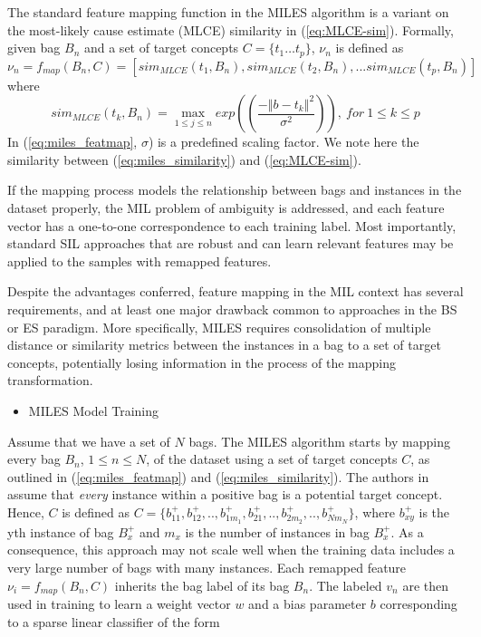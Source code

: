 \documentclass[12pt,dvips]{report}
\numberwithin{equation}{section}
\begin{document}
The standard feature mapping function in the MILES algorithm is a variant on the most-likely cause estimate (MLCE) similarity in (\ref{eq:MLCE-sim}). Formally, given bag $B_{n}$ and a set of target concepts $C=\{t_{1}\ldots t_{p}\}$, $\nu_{n}$ is defined as 
\begin{equation}
\nu_{n}=f_{map}(B_{n},C)=[sim_{MLCE}(t_{1},B_{n}),sim_{MLCE}(t_{2},B_{n}),...sim_{MLCE}(t_{p},B_{n})]\label{eq:miles_featmap}
\end{equation} where 
\begin{equation}
sim_{MLCE}(t_{k},B_{n})=\max\limits_{1 \leq j \leq n}exp({\left(\frac{-\left\Vert b-t_{k}\right\Vert ^{2}}{\sigma^{2}}\right)}),\: for\:1\leq k\leq p\label{eq:miles_similarity}
\end{equation}  In (\ref{eq:miles_featmap}, $\sigma$) is a predefined scaling factor. We note here the similarity between (\ref{eq:miles_similarity}) and (\ref{eq:MLCE-sim}).

If the mapping process models the relationship between bags and instances in the dataset properly, the MIL problem of ambiguity is addressed, and each feature vector has a one-to-one correspondence to each training label. Most importantly, standard SIL approaches that are robust and can learn relevant features may be applied to the samples with remapped features. 

Despite the advantages conferred, feature mapping in the MIL context has several requirements, and at least one major drawback common to approaches in the BS or ES paradigm.  More specifically, MILES requires consolidation of multiple distance or similarity metrics between the instances in a bag to a set of target concepts, potentially losing information in the process of the mapping transformation.

\begin{itemize}[leftmargin=12 pt]
\item MILES Model Training
\end{itemize}

Assume that we have a set of $N$ bags. The MILES algorithm starts by mapping every bag $B_{n}$, $1\leq n\leq N$, of the dataset using a set of target concepts $C$, as outlined in (\ref{eq:miles_featmap}) and (\ref{eq:miles_similarity}). The authors in \cite{chen06_miles} assume that \emph{every} instance within a positive bag is a potential target concept.  Hence, $C$ is defined as $C=\{b_{11}^{+},b_{12}^{+},..,b_{1m_{1}}^{+},b_{21}^{+},..,b_{2m_{2}}^{+},..,b_{Nm_{N}}^{+}\}$, where $b_{xy}^{+}$ is the yth instance of bag $B_{x}^{+}$ and $m_{x}$ is the number of instances in bag $B_{x}^{+}$. As a consequence, this approach may not scale well when the training data includes a very large number of bags with many instances.
Each remapped feature $\nu_{i}=f_{map}(B_{n},C)$ inherits the bag label of its bag $B_{n}$. The labeled $v_{n}$ are then used in training to learn a weight vector $w$ and a bias parameter $b$ corresponding to a sparse linear classifier of the form 
\end{document}
